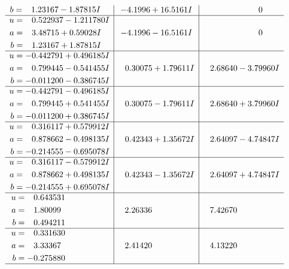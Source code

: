 \documentclass[1p]{elsarticle_modified}
\theoremstyle{definition}
\begin{document}
$$\begin{array}{c|c|c}
\begin{aligned}
b &= \phantom{-}1.23167 - 1.87815 I\end{aligned}
 & -4.1996 + 16.5161 I & \phantom{-0.000000 } 0 \\ \hline\begin{aligned}
u &= \phantom{-}0.522937 - 1.211780 I \\
a &= \phantom{-}3.48715 + 0.59028 I \\
b &= \phantom{-}1.23167 + 1.87815 I\end{aligned}
 & -4.1996 - 16.5161 I & \phantom{-0.000000 } 0 \\ \hline\begin{aligned}
u &= -0.442791 + 0.496185 I \\
a &= \phantom{-}0.799445 - 0.541455 I \\
b &= -0.011200 - 0.386745 I\end{aligned}
 & \phantom{-}0.30075 + 1.79611 I & \phantom{-}2.68640 - 3.79960 I \\ \hline\begin{aligned}
u &= -0.442791 - 0.496185 I \\
a &= \phantom{-}0.799445 + 0.541455 I \\
b &= -0.011200 + 0.386745 I\end{aligned}
 & \phantom{-}0.30075 - 1.79611 I & \phantom{-}2.68640 + 3.79960 I \\ \hline\begin{aligned}
u &= \phantom{-}0.316117 + 0.579912 I \\
a &= \phantom{-}0.878662 - 0.498135 I \\
b &= -0.214555 - 0.695078 I\end{aligned}
 & \phantom{-}0.42343 + 1.35672 I & \phantom{-}2.64097 - 4.74847 I \\ \hline\begin{aligned}
u &= \phantom{-}0.316117 - 0.579912 I \\
a &= \phantom{-}0.878662 + 0.498135 I \\
b &= -0.214555 + 0.695078 I\end{aligned}
 & \phantom{-}0.42343 - 1.35672 I & \phantom{-}2.64097 + 4.74847 I \\ \hline\begin{aligned}
u &= \phantom{-}0.643531\phantom{ +0.000000I} \\
a &= \phantom{-}1.80099\phantom{ +0.000000I} \\
b &= \phantom{-}0.494211\phantom{ +0.000000I}\end{aligned}
 & \phantom{-}2.26336\phantom{ +0.000000I} & \phantom{-}7.42670\phantom{ +0.000000I} \\ \hline\begin{aligned}
u &= \phantom{-}0.331630\phantom{ +0.000000I} \\
a &= \phantom{-}3.33367\phantom{ +0.000000I} \\
b &= -0.275880\phantom{ +0.000000I}\end{aligned}
 & \phantom{-}2.41420\phantom{ +0.000000I} & \phantom{-}4.13220\phantom{ +0.000000I}\\
 \hline 
 \end{array}$$\newpage\newpage\renewcommand{\arraystretch}{1}
\end{document}
